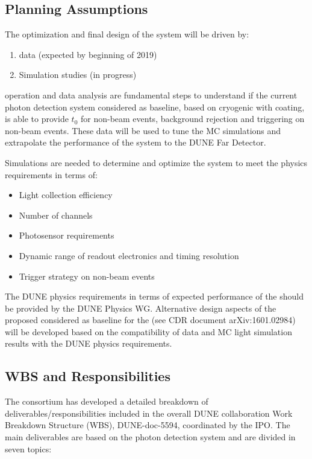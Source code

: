 \subsection{Planning Assumptions}
\label{sec:fddp-pd-12.2}

The optimization and final design of the \dual {} system will be driven by:
\begin{enumerate}
\item {} data (expected by beginning of 2019)
\item Simulation studies (in progress)
\end{enumerate}

 operation and data analysis are fundamental steps to understand if the current photon detection system considered as baseline, based on cryogenic  with  coating, is able to provide $t_0$ for non-beam events, background rejection and triggering on non-beam events. These data will be used to tune the MC simulations and extrapolate the performance of the system to the DUNE Far Detector. 

Simulations are needed to determine and optimize the \dual {} system to meet the physics requirements in terms of:
\begin{itemize}
\item Light collection efficiency
\item Number of channels
\item Photosensor requirements
\item Dynamic range of readout electronics and timing resolution
\item Trigger strategy on non-beam events
\end{itemize}

The DUNE physics requirements in terms of expected performance of the  should be provided by the DUNE Physics WG. Alternative design aspects of the proposed  considered as baseline for the  (see CDR document arXiv:1601.02984) will be developed based on the compatibility of  data and MC light simulation results with the DUNE physics requirements.

\subsection{WBS and Responsibilities}
\label{sec:fddp-pd-12.3}

The \dual {} consortium has developed a detailed breakdown of deliverables/responsibilities included in the overall DUNE collaboration Work Breakdown Structure (WBS), DUNE-doc-5594, coordinated by the IPO. The main deliverables are based on the  photon detection system and are divided in seven topics: 

